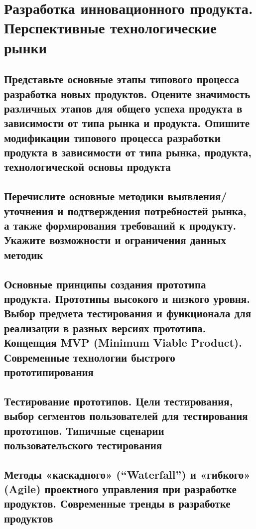 \section{Разработка инновационного продукта. Перспективные технологические рынки}

\subsection{Представьте основные этапы типового процесса разработка новых продуктов. Оцените значимость различных этапов для общего успеха продукта в зависимости от типа рынка и продукта. Опишите модификации типового процесса разработки продукта в зависимости от типа рынка, продукта, технологической основы продукта}

\pagebreak

\subsection{Перечислите основные методики выявления/уточнения и подтверждения потребностей рынка, а также формирования требований к продукту. Укажите возможности и ограничения данных методик}


\pagebreak

\subsection{Основные принципы создания прототипа продукта. Прототипы высокого и низкого уровня. Выбор предмета тестирования и функционала для реализации в разных версиях прототипа. Концепция MVP (Minimum Viable Product). Современные технологии быстрого прототипирования}


\pagebreak

\subsection{Тестирование прототипов. Цели тестирования, выбор сегментов пользователей для тестирования прототипов. Типичные сценарии пользовательского тестирования}


\pagebreak

\subsection{Методы «каскадного» (“Waterfall”) и «гибкого» (Agile) проектного управления при разработке продуктов. Современные тренды в разработке продуктов}


\pagebreak
